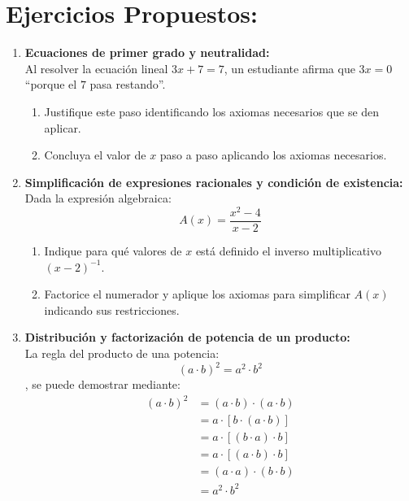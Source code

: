 \newpage

\section{Ejercicios Propuestos:}

\begin{enumerate}
    \item \textbf{Ecuaciones de primer grado y neutralidad:}\\
    Al resolver la ecuación lineal $3x + 7 = 7$, un estudiante afirma que $3x = 0$ ``porque el $7$ pasa restando''. 
    \begin{enumerate}
        \item Justifique este paso identificando los axiomas necesarios que se den aplicar.
        \item Concluya el valor de $x$ paso a paso aplicando los axiomas necesarios.
    \end{enumerate}

    \item \textbf{Simplificación de expresiones racionales y condición de existencia:}\\
    Dada la expresión algebraica:
    \[
    A(x) = \frac{x^2 - 4}{x - 2}
    \]
    \begin{enumerate}
        \item Indique para qué valores de $x$ está definido el inverso multiplicativo $(x - 2)^{-1}$.
        \item Factorice el numerador y aplique los axiomas para simplificar $A(x)$ indicando sus restricciones.
    \end{enumerate}

    \item \textbf{Distribución y factorización de potencia de un producto:}\\
    La regla del producto de una potencia:
    $$(a \cdot b)^2 = a^2 \cdot b^2$$
    , se puede demostrar mediante:
    \begin{align*}
    (a \cdot b)^2   &= (a \cdot b) \cdot (a \cdot b) \\  
                    &= a \cdot [b \cdot (a \cdot b)] \\ 
                    &= a \cdot [(b \cdot a) \cdot b] \\ 
                    &= a \cdot [(a \cdot b) \cdot b] \\
                    &= (a \cdot a) \cdot (b \cdot b) \\
                    &= a^2 \cdot b^2    
    \end{align*}
    

\end{enumerate}
